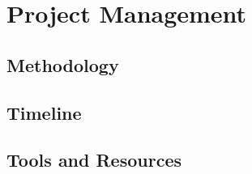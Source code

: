 
\section{Project Management}
\label{sec:pm}

\subsection{Methodology}
\label{sec:pm-meth}

\subsection{Timeline}
\label{sec:pm-time}

\subsection{Tools and Resources}
\label{sec:pm-tr}
